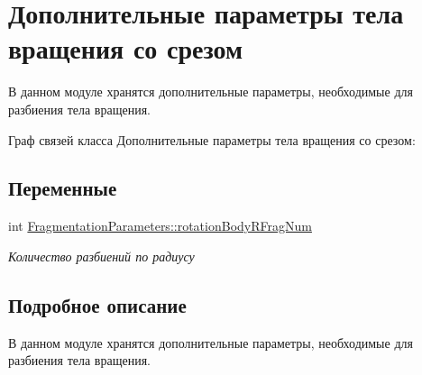 \hypertarget{group__rotation_bottom_cut_parameters}{}\section{Дополнительные параметры тела вращения со срезом}
\label{group__rotation_bottom_cut_parameters}


В данном модуле хранятся дополнительные параметры, необходимые для разбиения тела вращения.  


Граф связей класса Дополнительные параметры тела вращения со срезом\+:
\subsection*{Переменные}
\begin{DoxyCompactItemize}
\item 
\mbox{\label{group__rotation_bottom_cut_parameters_ga5e04e32e06f1344ec8761ec402b90ca6}} 
int \mbox{\hyperlink{group__rotation_bottom_cut_parameters_ga5e04e32e06f1344ec8761ec402b90ca6}{Fragmentation\+Parameters\+::rotation\+Body\+R\+Frag\+Num}}
\begin{DoxyCompactList}\small\item\em Количество разбиений по радиусу \end{DoxyCompactList}\end{DoxyCompactItemize}


\subsection{Подробное описание}
В данном модуле хранятся дополнительные параметры, необходимые для разбиения тела вращения. 

